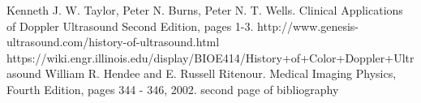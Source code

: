 \begin{thebibliography}{15}
 Kenneth J. W. Taylor, Peter N. Burns, Peter N. T. Wells.  Clinical Applications of Doppler Ultrasound Second Edition, pages 1-3.
 http://www.genesis-ultrasound.com/history-of-ultrasound.html
 https://wiki.engr.illinois.edu/display/BIOE414/History+of+Color+Doppler+Ultrasound
 William R. Hendee and E. Russell Ritenour. Medical Imaging Physics, Fourth Edition, pages 344 - 346, 2002.
\newpage
second page of bibliography
\end{thebibliography}